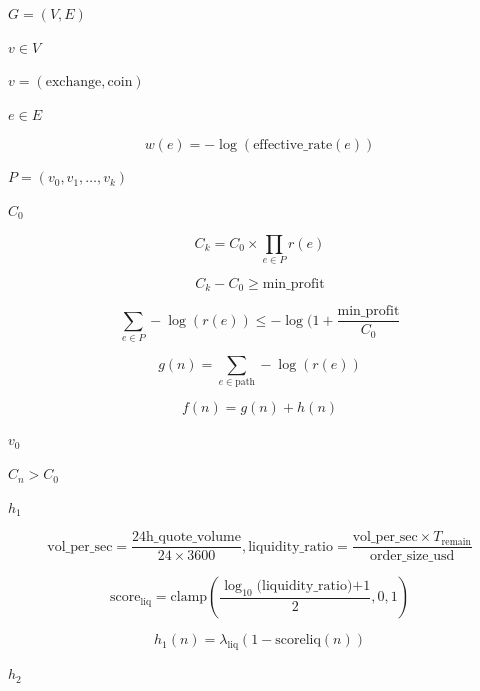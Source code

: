 $G = (V,E)$

$v \in V$

$v = (\text{exchange}, \text{coin})$

$e \in E$

\begin{equation}
    w(e) = -\log (\text{effective\_rate}(e))
\end{equation}

$P = (v_0, v_1, \dots, v_k)$

$C_0$

\begin{equation}
    C_k = C_0 \times \prod_{e \in P}r(e)
\end{equation}

\begin{equation}
    C_k - C_0 \geq \text{min\_profit}
\end{equation}

\begin{equation}
    \sum_{e \in P} - \log(r(e)) \leq -\log(1+ \frac{\text{min\_profit}}{C_0}
\end{equation}

\begin{equation}
    g(n) = \sum_{e \in \text{path}} - \log(r(e))
\end{equation}

\begin{equation}
    f(n) = g(n) + h(n)
\end{equation}

$v_0$

$C_n > C_0$

$h_1$

\begin{equation}
    \text{vol\_per\_sec} = \frac{\text{24h\_quote\_volume}}{24\times3600}, \text{liquidity\_ratio} =\frac{\text{vol\_per\_sec}\times T_{\text{remain}}}{\text{order\_size\_usd}}
\end{equation}

\begin{equation}
    \text{score}_\text{liq} = \text{clamp}(\frac{\log_{10}(\text{liquidity\_ratio)+1}}{2},0, 1)
\end{equation}

\begin{equation}
    h_1(n) = \lambda_{\text{liq}}(1-\text{scoreliq}(n))
\end{equation}

$h_2$

